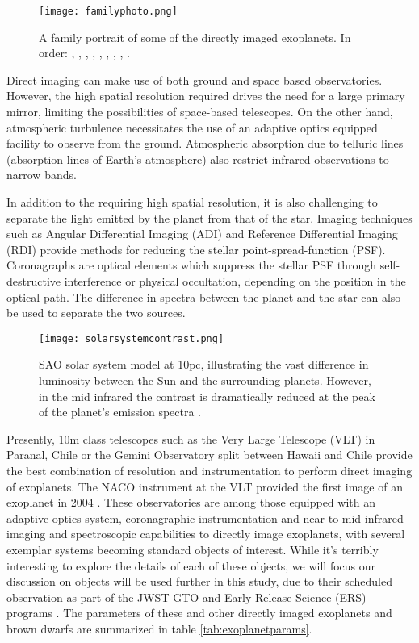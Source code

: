 \begin{figure}[t]
	\centering
	\texttt{[image: familyphoto.png]}
	\caption{A family portrait of some of the directly imaged exoplanets.
		In order:
	\parencite{Marois2010}, \parencite{Rameau2013}, \parencite{Stolker2020}, \parencite{Sallum2015}, \parencite{Keppler2018}, \parencite{Currie2012}, \parencite{Macintosh2015}, \parencite{Chauvin2004}, \parencite{Quanz2010}.}
	\label{fig:family}
\end{figure}

Direct imaging can make use of both ground and space based observatories. 
However, the high spatial resolution required drives the need for a large primary mirror, limiting the possibilities of space-based telescopes. 
On the other hand, atmospheric turbulence necessitates the use of an adaptive optics equipped facility to observe from the ground. 
Atmospheric absorption due to telluric lines (absorption lines of Earth's atmosphere) also restrict infrared observations to narrow bands.

In addition to the requiring high spatial resolution, it is also challenging to separate the light emitted by the planet from that of the star.
Imaging techniques such as Angular Differential Imaging (ADI) \parencite{Marois2006} and Reference Differential Imaging (RDI) \parencite{Lafreniere2009,Soummer2011} provide methods for reducing the stellar point-spread-function (PSF). %
Coronagraphs are optical elements which suppress the stellar PSF through self-destructive interference or physical occultation, depending on the position in the optical path.
The difference in spectra between the planet and the star can also be used to separate the two sources.

\begin{figure}[t]
	\centering
	\texttt{[image: solarsystemcontrast.png]}
	\caption{SAO solar system model at 10pc, illustrating the vast difference in luminosity between the Sun and the surrounding planets. However, in the mid infrared the contrast is dramatically reduced at the peak of the planet's emission spectra \parencite{DesMarais2002}.}
	\label{fig:solarsystem}
\end{figure}
Presently, 10m class telescopes such as the Very Large Telescope (VLT) in Paranal, Chile or the Gemini Observatory split between Hawaii and Chile provide the best combination of resolution and instrumentation to perform direct imaging of exoplanets.
The NACO instrument at the VLT provided the first image of an exoplanet in 2004 \parencite{Chauvin2004}.
These observatories are among those equipped with an adaptive optics system, coronagraphic instrumentation and near to mid infrared imaging and spectroscopic capabilities to directly image exoplanets, with several exemplar systems becoming standard objects of interest.
While it's terribly interesting to explore the details of each of these objects, we will focus our discussion on objects will be used further in this study, due to their scheduled observation as part of the JWST GTO and Early Release Science (ERS) programs \parencite{Beichman2019}. 
The parameters of these and other directly imaged exoplanets and brown dwarfs are summarized in table \ref{tab:exoplanetparams}. 

